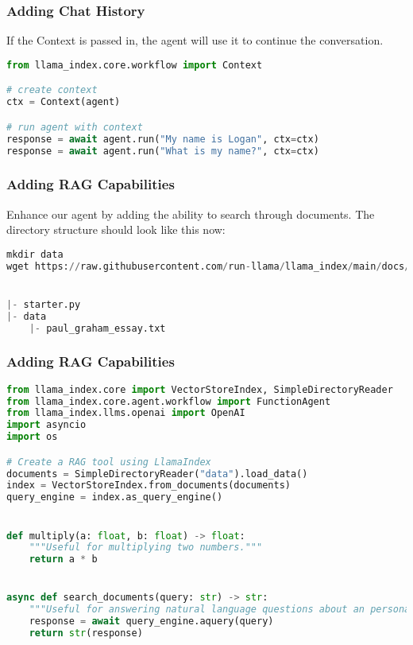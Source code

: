 \begin{frame}[fragile]\frametitle{Adding Chat History}

If the Context is passed in, the agent will use it to continue the conversation.

\begin{lstlisting}[language=Python]
from llama_index.core.workflow import Context

# create context
ctx = Context(agent)

# run agent with context
response = await agent.run("My name is Logan", ctx=ctx)
response = await agent.run("What is my name?", ctx=ctx)
\end{lstlisting}
\end{frame}

\begin{frame}[fragile]\frametitle{Adding RAG Capabilities}

Enhance our agent by adding the ability to search through documents. The directory structure should look like this now:


\begin{lstlisting}[language=Python]
mkdir data
wget https://raw.githubusercontent.com/run-llama/llama_index/main/docs/docs/examples/data/paul_graham/paul_graham_essay.txt -O data/paul_graham_essay.txt


|- starter.py
|- data
	|- paul_graham_essay.txt
\end{lstlisting}
\end{frame}


\begin{frame}[fragile]\frametitle{Adding RAG Capabilities}

\begin{lstlisting}[language=Python]
from llama_index.core import VectorStoreIndex, SimpleDirectoryReader
from llama_index.core.agent.workflow import FunctionAgent
from llama_index.llms.openai import OpenAI
import asyncio
import os

# Create a RAG tool using LlamaIndex
documents = SimpleDirectoryReader("data").load_data()
index = VectorStoreIndex.from_documents(documents)
query_engine = index.as_query_engine()


def multiply(a: float, b: float) -> float:
    """Useful for multiplying two numbers."""
    return a * b


async def search_documents(query: str) -> str:
    """Useful for answering natural language questions about an personal essay written by Paul Graham."""
    response = await query_engine.aquery(query)
    return str(response)
\end{lstlisting}
\end{frame}

